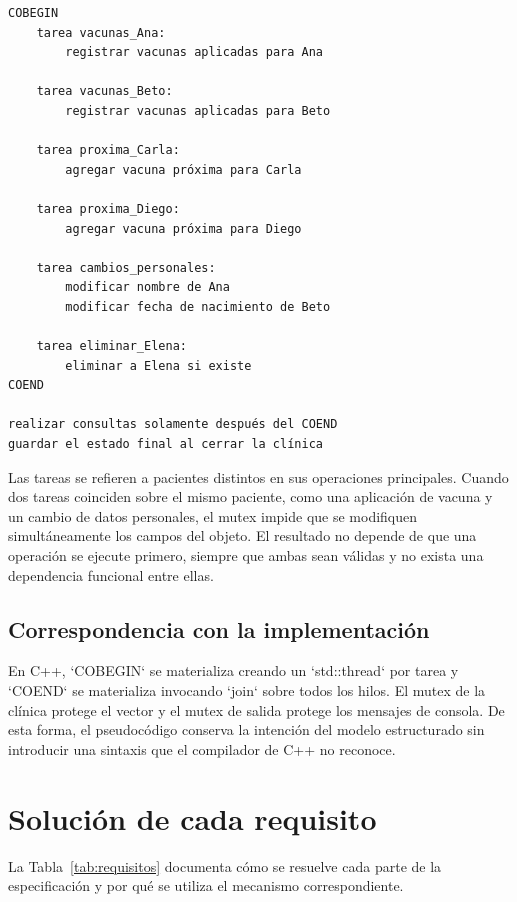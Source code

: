 \documentclass[12pt,letterpaper]{article}
\begin{document}
\begin{lstlisting}[language={},caption={Pseudocódigo de actualizaciones concurrentes.},label={lst:actualizaciones}]
COBEGIN
    tarea vacunas_Ana:
        registrar vacunas aplicadas para Ana

    tarea vacunas_Beto:
        registrar vacunas aplicadas para Beto

    tarea proxima_Carla:
        agregar vacuna próxima para Carla

    tarea proxima_Diego:
        agregar vacuna próxima para Diego

    tarea cambios_personales:
        modificar nombre de Ana
        modificar fecha de nacimiento de Beto

    tarea eliminar_Elena:
        eliminar a Elena si existe
COEND

realizar consultas solamente después del COEND
guardar el estado final al cerrar la clínica
\end{lstlisting}

Las tareas se refieren a pacientes distintos en sus operaciones principales.
Cuando dos tareas coinciden sobre el mismo paciente, como una aplicación de
vacuna y un cambio de datos personales, el mutex impide que se modifiquen
simultáneamente los campos del objeto. El resultado no depende de que una
operación se ejecute primero, siempre que ambas sean válidas y no exista una
dependencia funcional entre ellas.

\subsection{Correspondencia con la implementación}

En C++, `COBEGIN` se materializa creando un `std::thread` por tarea y `COEND`
se materializa invocando `join` sobre todos los hilos. El mutex de la clínica
protege el vector y el mutex de salida protege los mensajes de consola. De esta
forma, el pseudocódigo conserva la intención del modelo estructurado sin
introducir una sintaxis que el compilador de C++ no reconoce.

\section{Solución de cada requisito}

La Tabla~\ref{tab:requisitos} documenta cómo se resuelve cada parte de la
especificación y por qué se utiliza el mecanismo correspondiente.
\end{document}
